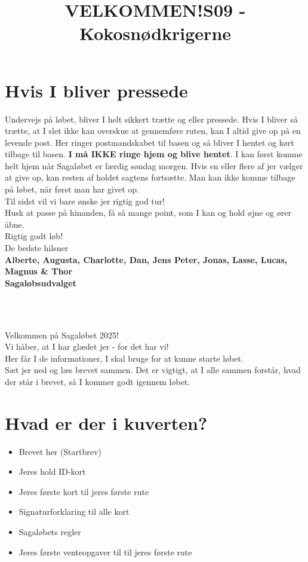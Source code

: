 \section{Hvis I bliver pressede}
Undervejs på løbet, bliver I helt sikkert trætte og eller pressede. Hvis I bliver så trætte, at I slet ikke kan overskue at gennemføre ruten, kan I altid give op på en levende post. Her ringer postmandskabet til basen og så bliver I hentet og kørt tilbage til basen. \textbf{I må IKKE ringe hjem og blive hentet}. I kan først komme helt hjem når Sagaløbet er færdig søndag morgen. Hvis en eller flere af jer vælger at give op, kan resten af holdet sagtens fortsætte. Man kan ikke komme tilbage på løbet, når først man har givet op.\\
\newline
Til sidst vil vi bare ønske jer rigtig god tur!\\
Husk at passe på hinanden, få så mange point, som I kan og hold øjne og ører åbne.\\
\newline
Rigtig godt løb!\\
\newline
\textcolor{søblå}{De bedste hilsner}\\
\textcolor{natblå}{\textbf{Alberte, Augusta, Charlotte, Dan, Jens Peter, Jonas, Lasse, Lucas, Magnus \& Thor}}\\
\textcolor{natblå}{\textbf{Sagaløbsudvalget}}\\
\newpage
\title{VELKOMMEN!}\\
\newline
\title{\textcolor{flammefarvet}{S09 - Kokosnødkrigerne }}\\
\newline
Velkommen på Sagaløbet 2025!\\
Vi håber, at I har glædet jer - for det har vi!\\
Her får I de informationer, I skal bruge for at kunne starte løbet.\\
Sæt jer ned og læs brevet sammen. Det er vigtigt, at I alle sammen forstår, hvad der står i brevet, så I kommer godt igennem løbet.
\section{Hvad er der i kuverten?}
\begin{itemize}
    \item Brevet her (Startbrev)
    \item Jeres hold ID-kort
    \item Jeres første kort til jeres første rute
    \item Signaturforklaring til alle kort
    \item Sagaløbets regler
    \item Jeres første venteopgaver til til jeres første rute
\end{itemize}
